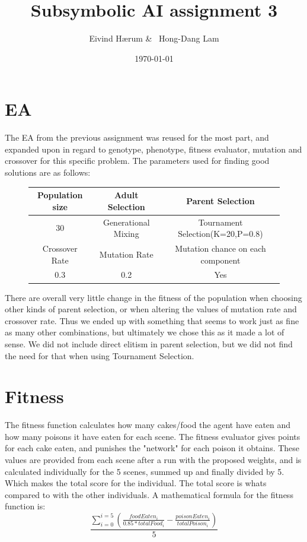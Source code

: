 \documentclass[12pt, a4paper]{article}
\title{Subsymbolic AI assignment 3}
\author{Eivind Hærum \& \ Hong-Dang Lam}
\date{\today} %
\begin{document}
\maketitle
% 
% 
\newpage

\tableofcontents
{}
\newpage

\section{EA}

The EA from the previous assignment was reused for the most part, and expanded upon in regard to genotype, phenotype, fitness evaluator, mutation and crossover for this specific problem. 
The parameters used for finding good solutions are as follows:

\begin{figure}[H]
	\begin{center}
	\begin{tabular}{c|c|c}
		Population size & Adult Selection & Parent Selection \\
		\hline
		30 & Generational Mixing  & Tournament Selection(K=20,P=0.8) \\
		\hline
		\hline
		Crossover Rate & Mutation Rate & Mutation chance on each component\\
		\hline
		0.3 & 0.2 & Yes\\
	\end{tabular}
	\end{center}
\end{figure}

There are overall very little change in the fitness of the population when choosing other kinds of parent selection, or when altering the values of mutation rate and crossover rate. Thus we ended up with something that seems to work just as fine as many other combinations, but ultimately we chose this as it made a lot of sense. We did not include direct elitism in parent selection, but we did not find the need for that when using Tournament Selection.


\section{Fitness}
The fitness function calculates how many cakes/food the agent have eaten and how many poisons it have eaten for each scene. The fitness evaluator gives points for each cake eaten, and punishes the "network" for each poison it obtains. These values are provided from each scene after a run with the proposed weights, and is calculated individually for the 5 scenes, summed up and finally divided by 5. Which makes the total score for the individual. The total score is whats compared to with the other individuals.
A mathematical formula for the fitness function is:
$$ \frac{\sum_{i=0}^{i =5}({\frac{foodEaten_i}{0.85 * totalFood_i} - \frac{poisonEaten_i}{totalPoison_i}})}{5} $$
\end{document}
